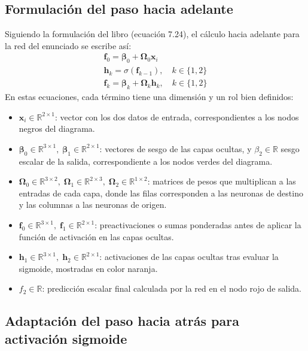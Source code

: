 \documentclass[10pt,a4paper]{article}
\begin{document}
\clearpage
\subsection*{Formulación del paso hacia adelante}

Siguiendo la formulación del libro (ecuación 7.24), el cálculo hacia adelante para la red del enunciado se escribe así:
\begin{gather}
    \mathbf{f}_0 = \boldsymbol{\beta}_0 + \boldsymbol{\Omega}_0 \mathbf{x}_i \\
    \mathbf{h}_k = \sigma(\mathbf{f}_{k-1}), \quad k \in \{1, 2\} \\
    \mathbf{f}_k = \boldsymbol{\beta}_k + \boldsymbol{\Omega}_k \mathbf{h}_k, \quad k \in \{1, 2\}
\end{gather}
En estas ecuaciones, cada término tiene una dimensión y un rol bien definidos:
\begin{itemize}
    \item $\mathbf{x}_i \in \mathbb{R}^{2 \times 1}$: vector con los dos datos de entrada, correspondientes a los nodos negros del diagrama.
    \item $\boldsymbol{\beta}_0 \in \mathbb{R}^{3 \times 1}, \; \boldsymbol{\beta}_1 \in \mathbb{R}^{2 \times 1}$: vectores de sesgo de las capas ocultas, y $\beta_2 \in \mathbb{R}$ sesgo escalar de la salida, correspondiente a los nodos verdes del diagrama.
    \item $\boldsymbol{\Omega}_0 \in \mathbb{R}^{3 \times 2}, \; \boldsymbol{\Omega}_1 \in \mathbb{R}^{2 \times 3}, \; \boldsymbol{\Omega}_2 \in \mathbb{R}^{1 \times 2}$: matrices de pesos que multiplican a las entradas de cada capa, donde las filas corresponden a las neuronas de destino y las columnas a las neuronas de origen.
    \item $\mathbf{f}_0 \in \mathbb{R}^{3 \times 1}, \; \mathbf{f}_1 \in \mathbb{R}^{2 \times 1}$: preactivaciones o sumas ponderadas antes de aplicar la función de activación en las capas ocultas.
    \item $\mathbf{h}_1 \in \mathbb{R}^{3 \times 1}, \; \mathbf{h}_2 \in \mathbb{R}^{2 \times 1}$: activaciones de las capas ocultas tras evaluar la sigmoide, mostradas en color naranja.
    \item $f_2 \in \mathbb{R}$: predicción escalar final calculada por la red en el nodo rojo de salida.
\end{itemize}

\subsection*{Adaptación del paso hacia atrás para activación sigmoide}
\end{document}

